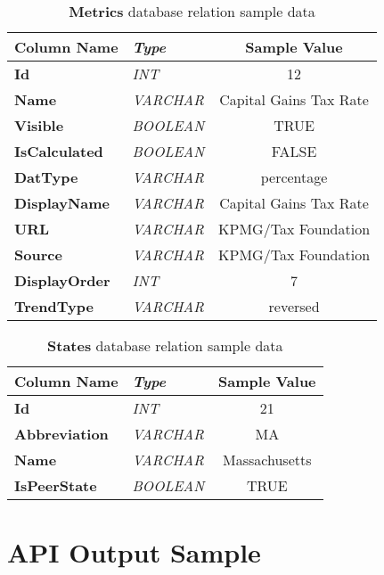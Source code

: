 \begin{appendices}
		\begin{table}[h]
			\centering
			\begin{tabularx}{\textwidth}{@{} >{\bf}Y >{\em}l c @{}} %
				\toprule
				Column Name		& Type		& Sample Value				\\
				\midrule
				
				Id				& INT		& 12						\\
				Name			& VARCHAR	& Capital Gains Tax Rate	\\
				Visible			& BOOLEAN	& TRUE						\\
				IsCalculated	& BOOLEAN	& FALSE						\\
				DatType			& VARCHAR	& percentage				\\
				DisplayName		& VARCHAR	& Capital Gains Tax Rate	\\
				URL				& VARCHAR	& KPMG/Tax Foundation		\\
				Source			& VARCHAR	& KPMG/Tax Foundation		\\
				DisplayOrder	& INT		& 7							\\
				TrendType		& VARCHAR	& reversed					\\
				
				\bottomrule
			\end{tabularx}
			\caption{\textbf{Metrics} database relation sample data}
			\label{tbl:metrictable}
		\end{table}
		
		\begin{table}[h]
			\centering
			\begin{tabularx}{\textwidth}{@{} >{\bf}Y >{\em}l c @{}} %
				\toprule
				Column Name		& Type		& Sample Value	\\
				\midrule
				
				Id				& INT		& 21			\\
				Abbreviation	& VARCHAR	& MA			\\
				Name			& VARCHAR	& Massachusetts	\\
				IsPeerState		& BOOLEAN	& TRUE			\\
				
				\bottomrule
			\end{tabularx}
			\caption{\textbf{States} database relation sample data}
			\label{tbl:statestable}
		\end{table}
		
	\chapter{API Output Sample} \label{app:dbsample}
	

\end{appendices}
